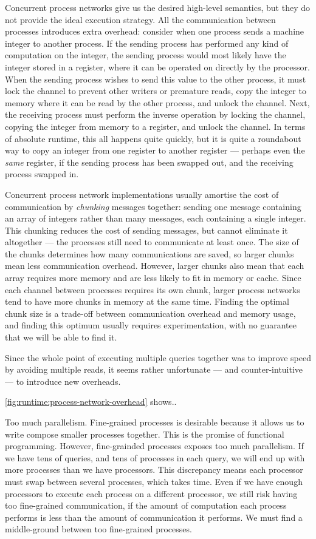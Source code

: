 Concurrent process networks give us the desired high-level semantics, but they do not provide the ideal execution strategy.
All the communication between processes introduces extra overhead: consider when one process sends a machine integer to another process.
If the sending process has performed any kind of computation on the integer, the sending process would most likely have the integer stored in a register, where it can be operated on directly by the processor.
When the sending process wishes to send this value to the other process, it must lock the channel to prevent other writers or premature reads, copy the integer to memory where it can be read by the other process, and unlock the channel.
Next, the receiving process must perform the inverse operation by locking the channel, copying the integer from memory to a register, and unlock the channel.
In terms of absolute runtime, this all happens quite quickly, but it is quite a roundabout way to copy an integer from one register to another register --- perhaps even the \emph{same} register, if the sending process has been swapped out, and the receiving process swapped in.

Concurrent process network implementations usually amortise the cost of communication by \emph{chunking} messages together: sending one message containing an array of integers rather than many messages, each containing a single integer.
This chunking reduces the cost of sending messages, but cannot eliminate it altogether --- the processes still need to communicate at least once.
The size of the chunks determines how many communications are saved, so larger chunks mean less communication overhead.
However, larger chunks also mean that each array requires more memory and are less likely to fit in memory or cache.
Since each channel between processes requires its own chunk, larger process networks tend to have more chunks in memory at the same time.
Finding the optimal chunk size is a trade-off between communication overhead and memory usage, and finding this optimum usually requires experimentation, with no guarantee that we will be able to find it.

Since the whole point of executing multiple queries together was to improve speed by avoiding multiple reads, it seems rather unfortunate --- and counter-intuitive --- to introduce new overheads.


\autoref{fig:runtime:process-network-overhead} shows..

Too much parallelism.
Fine-grained processes is desirable because it allows us to write compose smaller processes together.
This is the promise of functional programming.
However, fine-grainded processes exposes too much parallelism.
If we have tens of queries, and tens of processes in each query, we will end up with more processes than we have processors.
This discrepancy means each processor must swap between several processes, which takes time.
Even if we have enough processors to execute each process on a different processor, we still risk having too fine-grained communication, if the amount of computation each process performs is less than the amount of communication it performs.
We must find a middle-ground between too fine-grained processes.

